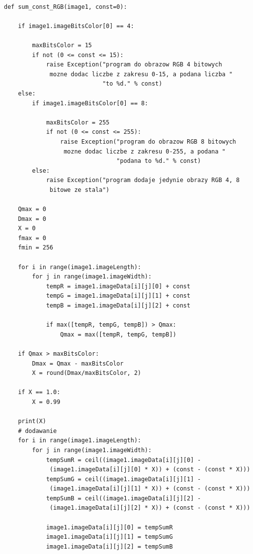 \documentclass[magisterska,openany]{pracadypl}
\begin{document}
\lstset{language=Python}
\vspace{0.25cm}
\begin{lstlisting}[caption={Sumowanie (okreslonej) stałej z obrazem RGB}]

def sum_const_RGB(image1, const=0):

    if image1.imageBitsColor[0] == 4:

        maxBitsColor = 15
        if not (0 <= const <= 15):
            raise Exception("program do obrazow RGB 4 bitowych
             mozne dodac liczbe z zakresu 0-15, a podana liczba "
                            "to %d." % const)
    else:
        if image1.imageBitsColor[0] == 8:

            maxBitsColor = 255
            if not (0 <= const <= 255):
                raise Exception("program do obrazow RGB 8 bitowych
                 mozne dodac liczbe z zakresu 0-255, a podana "
                                "podana to %d." % const)
        else:
            raise Exception("program dodaje jedynie obrazy RGB 4, 8
             bitowe ze stala")

    Qmax = 0
    Dmax = 0
    X = 0
    fmax = 0
    fmin = 256

    for i in range(image1.imageLength):
        for j in range(image1.imageWidth):
            tempR = image1.imageData[i][j][0] + const
            tempG = image1.imageData[i][j][1] + const
            tempB = image1.imageData[i][j][2] + const

            if max([tempR, tempG, tempB]) > Qmax:
                Qmax = max([tempR, tempG, tempB])

    if Qmax > maxBitsColor:
        Dmax = Qmax - maxBitsColor
        X = round(Dmax/maxBitsColor, 2)

    if X == 1.0:
        X = 0.99

    print(X)
    # dodawanie
    for i in range(image1.imageLength):
        for j in range(image1.imageWidth):
            tempSumR = ceil((image1.imageData[i][j][0] -
             (image1.imageData[i][j][0] * X)) + (const - (const * X)))
            tempSumG = ceil((image1.imageData[i][j][1] -
             (image1.imageData[i][j][1] * X)) + (const - (const * X)))
            tempSumB = ceil((image1.imageData[i][j][2] -
             (image1.imageData[i][j][2] * X)) + (const - (const * X)))

            image1.imageData[i][j][0] = tempSumR
            image1.imageData[i][j][1] = tempSumG
            image1.imageData[i][j][2] = tempSumB


\end{lstlisting}
\end{document}
